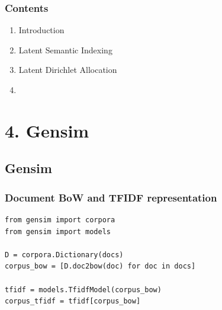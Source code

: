 \documentclass{beamer}
\begin{document}
\begin{frame}

    \frametitle{Contents}

	\large

    \begin{enumerate}
  
    	\item Introduction
    	\item Latent Semantic Indexing
    	\item Latent Dirichlet Allocation
    	\item {\bf \color{blue}{Gensim Overview}}
    
    \end{enumerate}

\end{frame}

\section{4. Gensim}
\subsection{Gensim}


\begin{frame}[fragile]

    \frametitle{Document BoW and TFIDF representation}

\begin{verbatim}
from gensim import corpora
from gensim import models

D = corpora.Dictionary(docs)
corpus_bow = [D.doc2bow(doc) for doc in docs]

tfidf = models.TfidfModel(corpus_bow)
corpus_tfidf = tfidf[corpus_bow]


    
\end{verbatim}

\end{frame}
\end{document}
